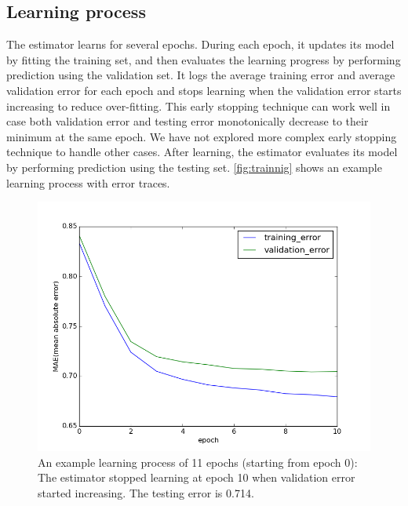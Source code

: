 \documentclass{article}
\begin{document}
\subsection{Learning process}
The estimator learns for several epochs.
During each epoch, it updates its model by fitting the training set, and 
then evaluates the learning progress by performing prediction using the 
validation set.
It logs the average training error and average validation error for each epoch 
and stops learning when the validation error starts increasing to reduce 
over-fitting.
This early stopping technique can work well in case both validation error and 
testing error monotonically decrease to their minimum at the same epoch.
We have not explored more complex early stopping technique to handle other 
cases.
After learning, the estimator evaluates its model by performing prediction 
using the testing set.
\autoref{fig:trainnig} shows an example learning process with error traces.
\begin{figure}[h]
	\centering
	\includegraphics[width=0.5\linewidth]{training}
	\caption{An example learning process of 11 epochs (starting from epoch 0): 
	The estimator stopped learning at epoch 10 when validation error started 
	increasing. The testing error is 0.714.}
	\label{fig:trainnig}
\end{figure}
\end{document}
